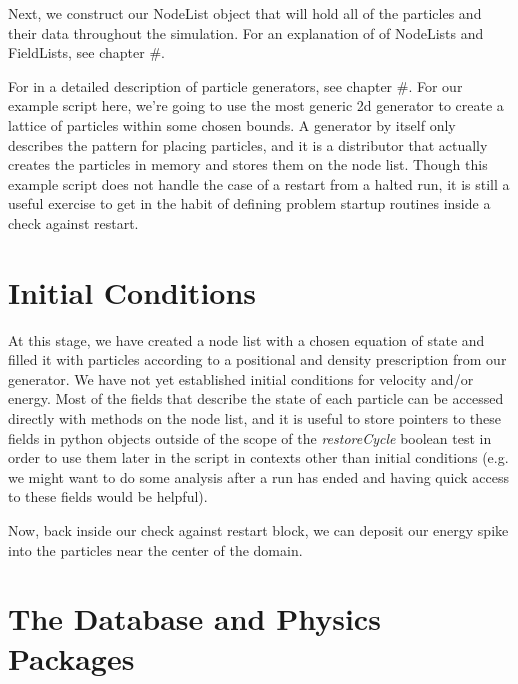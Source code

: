 \documentclass[11pt]{memoir}
\begin{document}
Next, we construct our NodeList object that will hold all of the particles and their data throughout the simulation.
For an explanation of of NodeLists and FieldLists, see chapter \#.



For in a detailed description of particle generators, see chapter \#.
For our example script here, we're going to use the most generic 2d generator to create a lattice of particles within some chosen bounds.
A generator by itself only describes the pattern for placing particles, and it is a distributor that actually creates the particles in memory and stores them on the node list.
Though this example script does not handle the case of a restart from a halted run, it is still a useful exercise to get in the habit of defining problem startup routines inside a check against restart.



\section{Initial Conditions}

At this stage, we have created a node list with a chosen equation of state and filled it with particles according to a positional and density prescription from our generator.
We have not yet established initial conditions for velocity and/or energy.
Most of the fields that describe the state of each particle can be accessed directly with methods on the node list, and it is useful to store pointers to these fields in python objects outside of the scope of the \textit{restoreCycle} boolean test in order to use them later in the script in contexts other than initial conditions (e.g. we might want to do some analysis after a run has ended and having quick access to these fields would be helpful).



Now, back inside our check against restart block, we can deposit our energy spike into the particles near the center of the domain.



\section{The Database and Physics Packages}
\end{document}
